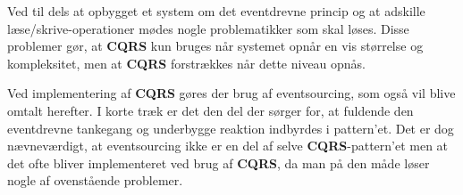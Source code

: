Ved til dels at opbygget et system om det eventdrevne princip og at adskille læse/skrive-operationer mødes nogle problematikker som skal løses. Disse problemer gør, at \textbf{CQRS} kun bruges når systemet opnår en vis størrelse og kompleksitet, men at \textbf{CQRS} forstrækkes når dette niveau opnås.\newline

Ved implementering af \textbf{CQRS} gøres der brug af eventsourcing, som også vil blive omtalt herefter. I korte træk er det den del der sørger for, at fuldende den eventdrevne tankegang og underbygge reaktion indbyrdes i pattern'et.
Det er dog nævneværdigt, at eventsourcing ikke er en del af selve \textbf{CQRS}-pattern'et men at det ofte bliver implementeret ved brug af \textbf{CQRS}, da man på den måde løser nogle af ovenstående problemer.

